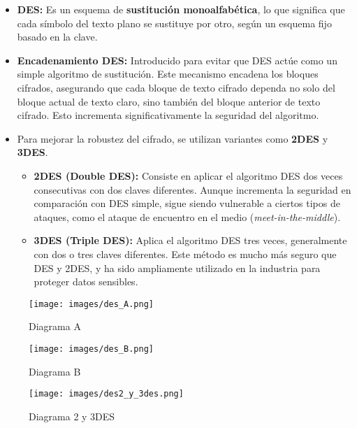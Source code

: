 \documentclass[a4paper,12pt]{article}
\begin{document}
\begin{itemize}
    \item \textbf{DES:} Es un esquema de \textbf{sustitución monoalfabética}, lo que significa que cada símbolo del texto plano se sustituye por otro, según un esquema fijo basado en la clave.
    \item \textbf{Encadenamiento DES:} Introducido para evitar que DES actúe como un simple algoritmo de sustitución. Este mecanismo encadena los bloques cifrados, asegurando que cada bloque de texto cifrado dependa no solo del bloque actual de texto claro, sino también del bloque anterior de texto cifrado. Esto incrementa significativamente la seguridad del algoritmo.
    \item Para mejorar la robustez del cifrado, se utilizan variantes como \textbf{2DES} y \textbf{3DES}. 
    \begin{itemize}
        \item \textbf{2DES (Double DES):} Consiste en aplicar el algoritmo DES dos veces consecutivas con dos claves diferentes. Aunque incrementa la seguridad en comparación con DES simple, sigue siendo vulnerable a ciertos tipos de ataques, como el ataque de encuentro en el medio (\textit{meet-in-the-middle}).
        \item \textbf{3DES (Triple DES):} Aplica el algoritmo DES tres veces, generalmente con dos o tres claves diferentes. Este método es mucho más seguro que DES y 2DES, y ha sido ampliamente utilizado en la industria para proteger datos sensibles.
    \end{itemize}
\end{itemize}

\begin{figure}[H]
    \centering
    \begin{minipage}{0.45\textwidth}
        \centering
        \texttt{[image: images/des\_A.png]}
        \caption{Diagrama A}
    \end{minipage}
    \hfill
    \begin{minipage}{0.45\textwidth}
        \centering
        \texttt{[image: images/des\_B.png]}
        \caption{Diagrama B}
    \end{minipage}
    \hfill
    \begin{minipage}{0.6\textwidth}
        \centering
        \texttt{[image: images/des2\_y\_3des.png]}
        \caption{Diagrama 2 y 3DES}
    \end{minipage}
\end{figure}
\end{document}
